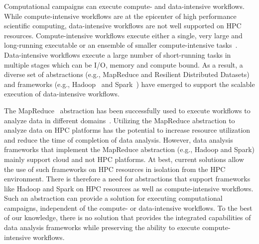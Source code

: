 Computational campaigns can execute compute- and data-intensive workflows. While
compute-intensive workflows are at the epicenter of high performance scientific
computing, data-intensive workflows are not well supported on HPC resources.
Compute-intensive workflows execute either a single, very large and long-running
executable or an ensemble of smaller compute-intensive
tasks~\cite{balasubramanian2018harnessing}. Data-intensive workflows execute a
large number of short-running tasks in multiple stages which can be I/O, memory
and compute bound. As a result, a diverse set of abstractions (e.g., MapReduce
and Resilient Distributed Datasets) and frameworks (e.g., Hadoop~\cite{hadoop} and Spark~\cite{zaharia2010spark}) have emerged to support the scalable execution of data-intensive workflows.



The MapReduce~\cite{dean2004mapreduce} abstraction has been successfully used to
execute workflows to analyze data in different
domains~\cite{hellerstein2012science}. Utilizing the MapReduce abstraction to
analyze data on HPC platforms has the potential to increase resource
utilization and reduce the time of completion of data analysis. However, data
analysis frameworks that implement the MapReduce abstraction (e.g., Hadoop and
Spark) mainly support cloud and not HPC platforms. At best, current solutions
allow the use of such frameworks on HPC resources in isolation from the HPC
environment. There is therefore a need for abstractions  that support frameworks like Hadoop and Spark
on HPC resources as well as compute-intensive workflows. Such an abstraction
can provide a solution for executing computational campaigns, independent of
the compute- or data-intensive workflows. To the best of our knowledge, there
is no solution that provides the integrated capabilities of data analysis
frameworks while preserving the ability to execute compute-intensive workflows.

